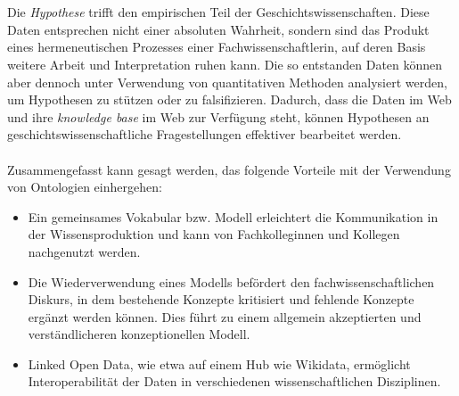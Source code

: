 \documentclass[12pt,a4paper]{article}
\begin{document}
{\\
\\
Die \textit{Hypothese} trifft den empirischen Teil der Geschichtswissenschaften. Diese Daten entsprechen nicht einer absoluten Wahrheit, sondern sind das Produkt eines hermeneutischen Prozesses einer Fachwissenschaftlerin, auf deren Basis weitere Arbeit und Interpretation ruhen kann. Die so entstanden Daten können aber dennoch unter Verwendung von quantitativen Methoden analysiert werden, um Hypothesen zu stützen oder zu falsifizieren. Dadurch, dass die Daten im Web und ihre \textit{knowledge base} im Web zur Verfügung steht, können Hypothesen an geschichtswissenschaftliche Fragestellungen effektiver bearbeitet werden.
\\
\\
Zusammengefasst kann gesagt werden, das folgende Vorteile mit der Verwendung von Ontologien einhergehen:}
\begin{itemize}
\item Ein gemeinsames Vokabular bzw. Modell erleichtert die Kommunikation in der Wissensproduktion und kann von Fachkolleginnen und Kollegen nachgenutzt werden.
\item Die Wiederverwendung eines Modells befördert den fachwissenschaftlichen Diskurs, in dem bestehende Konzepte kritisiert und fehlende Konzepte ergänzt werden können. Dies führt zu einem allgemein akzeptierten und verständlicheren konzeptionellen Modell.
\item Linked Open Data, wie etwa auf einem Hub wie Wikidata, ermöglicht Interoperabilität der Daten in verschiedenen wissenschaftlichen Disziplinen.
\end{itemize}


\newpage


\newpage
\listoffigures
\end{document}
